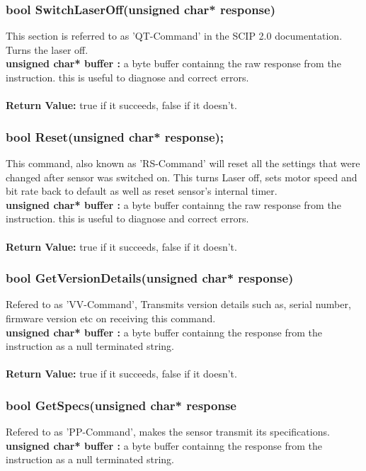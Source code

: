 \documentclass{book}
\begin{document}
\subsubsection{bool SwitchLaserOff(unsigned char* response)}
This section is referred to as 'QT-Command' in the SCIP 2.0 documentation. Turns the laser off.\\
\textbf{unsigned char* buffer : } a byte buffer containng the raw response from the instruction. this is useful to diagnose and correct errors.\\\\
\textbf{Return Value: }true if it succeeds, false if it doesn't.\\

\subsubsection{bool Reset(unsigned char* response); }
This command, also known as 'RS-Command' will reset all the settings that were changed after sensor was switched on. This turns Laser off,
sets motor speed and bit rate back to default as well as reset sensor’s internal timer.\\
\textbf{unsigned char* buffer : } a byte buffer containng the raw response from the instruction. this is useful to diagnose and correct errors.\\\\
\textbf{Return Value: }true if it succeeds, false if it doesn't.\\

\subsubsection{bool GetVersionDetails(unsigned char* response)}
Refered to as 'VV-Command', Transmits version details such as, serial number, firmware version etc on receiving this command.\\
\textbf{unsigned char* buffer : } a byte buffer containng the  response from the instruction as a null terminated string.\\\\

\textbf{Return Value: }true if it succeeds, false if it doesn't.\\

\subsubsection{bool GetSpecs(unsigned char* response} Refered to as 'PP-Command', makes the sensor transmit its specifications.\\
\textbf{unsigned char* buffer : } a byte buffer containng the  response from the instruction as a null terminated string.\\\\
\end{document}
